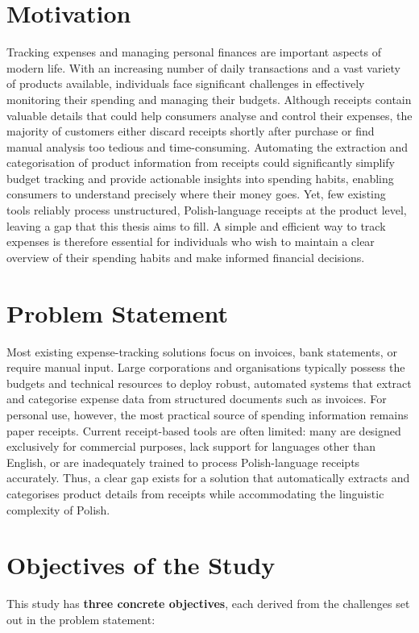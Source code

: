 \documentclass{SGGW-thesis-EN}
\begin{document}
\section{Motivation}
Tracking expenses and managing personal finances are important aspects of modern life.
With an increasing number of daily transactions and a vast variety of products available,
individuals face significant challenges in effectively monitoring their spending and managing
their budgets.
Although receipts contain valuable details that could help consumers analyse and control their
expenses, the majority of customers either discard receipts shortly after purchase or find manual
analysis too tedious and time-consuming.
Automating the extraction and categorisation of product information from receipts could
significantly simplify budget tracking and provide actionable insights into spending habits,
enabling consumers to understand precisely where their money goes.
Yet, few existing tools reliably process unstructured, Polish-language receipts at the product level,
leaving a gap that this thesis aims to fill.
A simple and efficient way to track expenses is therefore essential for individuals who wish to
maintain a clear overview of their spending habits and make informed financial decisions.

\section{Problem Statement}
Most existing expense-tracking solutions focus on invoices, bank statements, or require manual input.
Large corporations and organisations typically possess the budgets and technical resources to deploy robust,
automated systems that extract and categorise expense data from structured documents such as invoices.
For personal use, however, the most practical source of spending information remains paper receipts.
Current receipt-based tools are often limited: many are designed exclusively for commercial purposes,
lack support for languages other than English,
or are inadequately trained to process Polish-language receipts accurately.
Thus, a clear gap exists for a solution that automatically extracts and categorises product details
from receipts while accommodating the linguistic complexity of Polish.


\section{Objectives of the Study}

This study has \textbf{three concrete objectives}, each derived from the challenges set out in the problem statement:
\end{document}
